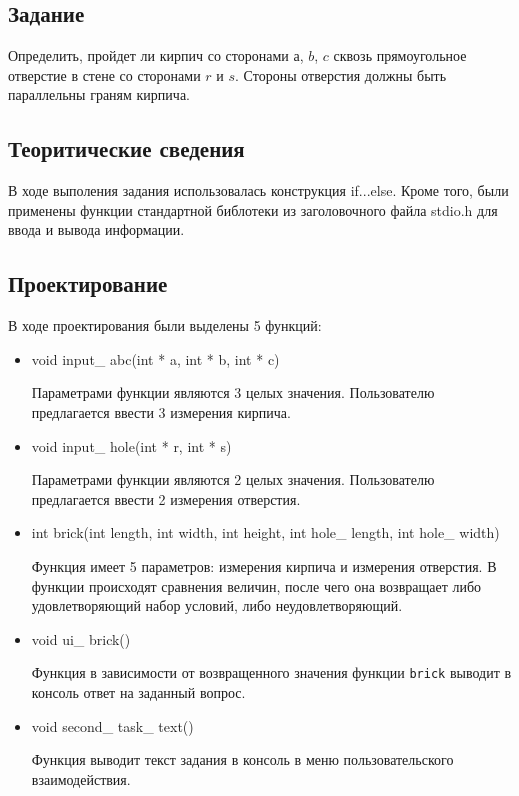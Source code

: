 \documentclass[12pt,a4paper]{report}
\begin{document}
\subsection{Задание}

Определить, пройдет ли кирпич со сторонами $а$, $b$, $c$ сквозь прямоугольное отверстие в стене со сторонами $r$ и $s$. Стороны отверстия должны быть параллельны граням кирпича. 

\subsection{Теоритические сведения}

В ходе выполения задания использовалась конструкция if...else. Кроме того, были применены функции стандартной библотеки из заголовочного файла stdio.h для ввода и вывода информации.

\subsection{Проектирование}


В ходе проектирования были выделены 5 функций:

\begin{itemize}

	\item void input\_ abc(int * a, int * b, int * c)

	Параметрами функции являются 3 целых значения.	
	Пользователю предлагается ввести 3 измерения кирпича.
	
	\item void input\_ hole(int * r, int * s)
	
	Параметрами функции являются 2 целых значения.
	Пользователю предлагается ввести 2 измерения отверстия.
	
	\item int brick(int length, int width, int height, int hole\_ length, int hole\_ width)
	
	Функция имеет 5 параметров: измерения кирпича и измерения отверстия.
	В функции происходят сравнения величин, после чего она возвращает либо удовлетворяющий набор условий, либо неудовлетворяющий.
	
	\item void ui\_ brick()
	
	Функция в зависимости от возвращенного значения функции \texttt{brick} выводит в консоль ответ на заданный вопрос.
	
	\item void second\_ task\_ text()
	
	Функция выводит текст задания в консоль в меню пользовательского взаимодействия.
	
	
	
\end{itemize}
\end{document}
